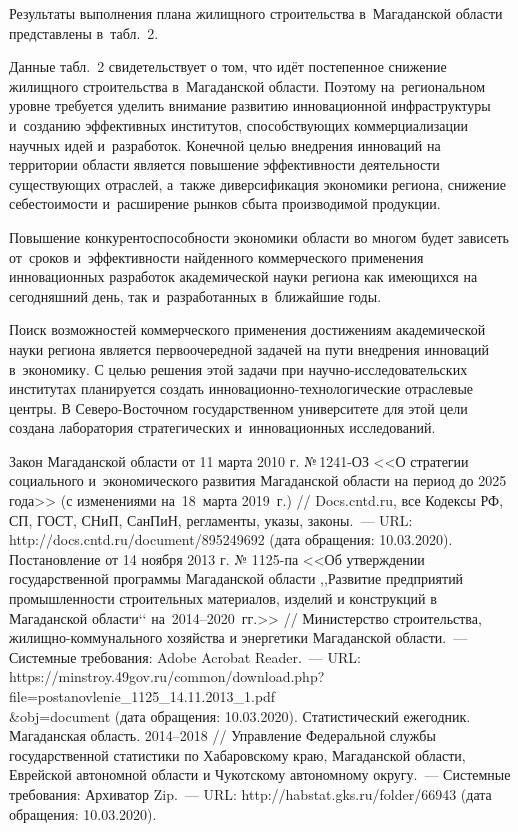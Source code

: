 Результаты выполнения плана жилищного строительства в~Магаданской области представлены в~табл.~2.



Данные табл.~2 свидетельствует о том, что идёт постепенное снижение жилищного строительства в~Магаданской области. Поэтому на~региональном уровне требуется уделить внимание развитию инновационной инфраструктуры и~созданию эффективных институтов, способствующих коммерциализации научных идей и~разработок. Конечной целью внедрения инноваций на территории области является повышение эффективности деятельности существующих отраслей, а~также диверсификация экономики региона, снижение себестоимости и~расширение рынков сбыта производимой продукции\enlargethispage{\baselineskip}.

Повышение конкурентоспособности экономики области во многом будет зависеть от~сроков и~эффективности найденного коммерческого применения инновационных разработок академической науки региона как имеющихся на сегодняшний день, так и~разработанных в~ближайшие годы.

Поиск возможностей коммерческого применения достижениям академической науки региона является первоочередной задачей на пути внедрения инноваций в~экономику. С целью решения этой задачи при научно-исследовательских институтах планируется создать ин\-но\-ва\-цион\-но-тех\-но\-ло\-ги\-чес\-кие отраслевые центры. В Северо-Восточном государственном университете для этой цели создана лаборатория стратегических и~инновационных исследований.

\begin{thebibliography}{99}
\bibitem{}Закон Магаданской области от 11 марта 2010 г. №\,1241-ОЗ <<О стратегии социального и~экономического развития Магаданской области на период до 2025 года>> (с изменениями на~18~марта 2019~г.) // Docs.cntd.ru, все Кодексы РФ, СП, ГОСТ, СНиП, СанПиН, регламенты, указы, законы.~--- URL: http://docs.cntd.ru/document/895249692 (дата обращения: 10.03.2020).
\bibitem{}Постановление от 14 ноября 2013 г. № 1125-па <<Об утверждении государственной программы Магаданской области ,,Развитие предприятий промышленности строительных материалов, изделий и конструкций в Магаданской области‘‘ на~2014--2020~гг.>> // Министерство строительства, жилищно-коммунального хозяйства и энергетики Магаданской области.~--- Системные требования: Adobe Acrobat Reader.~--- URL:
https://minstroy.49gov.ru/common/download.php?file=postanovlenie\_1125\_14.11.2013\_1.pdf\\\&obj=document (дата обращения: 10.03.2020).
\bibitem{}Статистический ежегодник. Магаданская область. 2014--2018 // Управление Федеральной службы государственной статистики по Хабаровскому краю, Магаданской области, Еврейской автономной области и Чукотскому автономному округу.~--- Системные требования: Архиватор Zip.~--- URL: http://habstat.gks.ru/folder/66943 (дата обращения: 10.03.2020).

\end{thebibliography}
